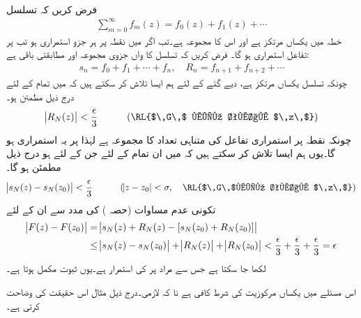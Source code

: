 \quad {}\\
فرض کریں کہ تسلسل
\begin{align*}
\sum\limits_{m=0}^{\infty} f_m(z)=f_0(z)+f_1(z)+\cdots
\end{align*}
خطہ  میں یکساں مرتکز ہے اور اس کا مجموعہ  ہے۔تب اگر  میں نقطہ  پر ہر جزو  استمراری ہو تب  پر تفاعل   استمراری ہو گا۔
\quad
فرض کریں کہ تسلسل کا  واں جزوی مجموعہ  اور مطابقتی باقی  ہے:
\begin{align*}
s_n=f_0+f_1+\cdots+f_n,\quad R_n=f_{n+1}+f_{n+2}+\cdots
\end{align*}
چونکہ تسلسل یکساں مرتکز ہے، دیے گئے  کے لئے ہم ایسا  تلاش کر سکتے ہیں کہ  میں تمام  کے لئے درج ذیل مطمئن ہو۔
\begin{align*}
\abs{R_N(z)}<\frac{\epsilon}{3}\quad \quad \quad (\text{\RL{$\,G\,$ میں تمام $\,z\,$}})
\end{align*}
چونکہ  نقطہ  پر استمراری تفاعل کی متناہی تعداد  کا مجموعہ ہے لہٰذا  پر یہ استمراری ہو گا۔یوں ہم ایسا  تلاش کر سکتے ہیں کہ   میں ان تمام  کے لئے جن کے لئے  ہو درج ذیل مطمئن ہو گا۔
\begin{align*}
\abs{s_N(z)-s_N(z_0)}<\frac{\epsilon}{3}\quad \quad \quad (\abs{z-z_0}<\sigma, \quad \text{\RL{$\,G\,$میں تمام $\,z\,$}})
\end{align*}
تکونی عدم مساوات (حصہ ) کی مدد سے ان  کے لئے
\begin{align*}
\abs{F(z)-F(z_0)}&=\abs{s_N(z)+R_N(z)-[s_N(z_0)+R_N(z_0)]}\\
&\le \abs{s_N(z)-s_N(z_0)}+\abs{R_N(z)}+\abs{R_N(z_0)}<\frac{\epsilon}{3}+\frac{\epsilon}{3}+\frac{\epsilon}{3}=\epsilon
\end{align*}
لکھا جا سکتا ہے جس سے مراد  پر  کی استمرار ہے۔یوں ثبوت مکمل ہوتا ہے۔

اس مسئلے میں یکساں مرکوزیت کی شرط  کافی ہے  نا کہ لازمی۔درج ذیل مثال اس حقیقت کی وضاحت کرتی ہے۔

